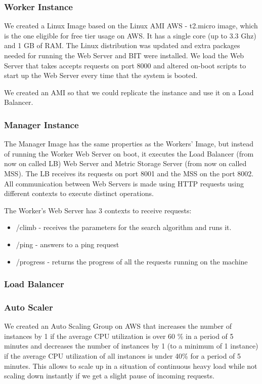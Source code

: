 \documentclass[times, 10pt,twocolumn]{article}
\begin{document}
\subsubsection{Worker Instance}
   We created a Linux Image based on the Linux AMI AWS - t2.micro image, 
   which is the one eligible for free tier usage on AWS. It has a single core
   (up to 3.3 Ghz) and 1 GB of RAM. The Linux distribution was updated and
   extra packages needed for running the Web Server and BIT were installed.
   We load the Web Server that takes accepts requests on port 8000 and 
   altered on-boot scripts to start up the Web Server every time that
   the system is booted.

   We created an AMI so that we could replicate the instance and use it 
   on a Load Balancer. 

\subsubsection{Manager Instance} 
   The Manager Image has the same properties as the Workers' Image, but 
   instead of running the Worker Web Server on boot, it executes the Load Balancer
   (from now on called LB) Web Server and Metric Storage Server (from now on 
   called MSS). The LB receives its requests on port 8001 and the MSS on the
   port 8002. All communication between Web Servers is made using HTTP requests
   using different contexts to execute distinct operations.
   
   The Worker's Web Server has 3 contexts to receive requests:
   \begin{itemize}
      \item /climb - receives the parameters for the search algorithm and runs it. 
      \item /ping - answers to a ping request 
      \item /progress - returns the progress of all the requests running on the machine
   \end{itemize}
   
\subsubsection{Load Balancer}
\subsubsection{Auto Scaler}
   We created an Auto Scaling Group on AWS that increases the number of instances by
   1 if the average CPU utilization is over 60 \% in a period of 5 minutes and
   decreases the number of instances by 1 (to a minimum of 1 instance) if the average CPU 
   utilization of all instances is under 40\% for a period of 5 minutes. This allows
   to scale up in a situation of continuous heavy load while not scaling down instantly
   if we get a slight pause of incoming requests. 
\end{document}
